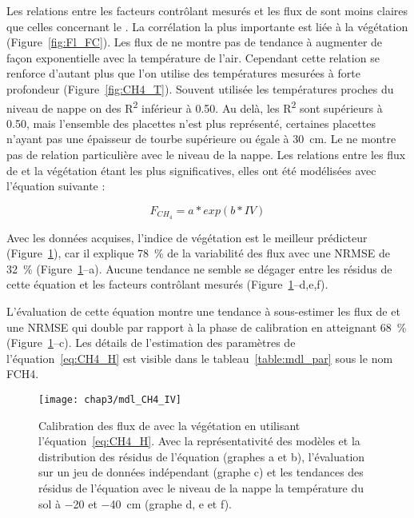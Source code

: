 Les relations entre les facteurs contrôlant mesurés et les flux de \chh sont moins claires que celles concernant le \coo.
La corrélation la plus importante est liée à la végétation (Figure~\ref{fig:Fl_FC}).
Les flux de \chh ne montre pas de tendance à augmenter de façon exponentielle avec la température de l'air.
Cependant cette relation se renforce d'autant plus que l'on utilise des températures mesurées à forte profondeur (Figure~\ref{fig:CH4_T}).
Souvent utilisée les températures proches du niveau de nappe on des R\textsuperscript{2} inférieur à \num{0.50}.
Au delà, les R\textsuperscript{2} sont supérieurs à \num{0.50}, mais l'ensemble des placettes n'est plus représenté, certaines placettes n'ayant pas une épaisseur de tourbe supérieure ou égale à \SI{30}{\centi\metre}.
Le \chh ne montre pas de relation particulière avec le niveau de la nappe.
Les relations entre les flux de \chh et la végétation étant les plus significatives, elles ont été modélisées avec l'équation suivante :

\begin{equation} \label{eq:CH4_H}
F_{CH_{4}} = a*exp(b*IV)
\end{equation}

Avec les données acquises, l'indice de végétation est le meilleur prédicteur (Figure~\ref{fig:CH4_mdl}), car il explique \SI{78}{\percent} de la variabilité des flux \chh avec une NRMSE de \SI{32}{\percent} (Figure~\ref{fig:CH4_mdl}--a).
Aucune tendance ne semble se dégager entre les résidus de cette équation et les facteurs contrôlant mesurés (Figure~\ref{fig:CH4_mdl}--d,e,f).

L'évaluation de cette équation montre une tendance à sous-estimer les flux de \chh et une NRMSE qui double par rapport à la phase de calibration en atteignant \SI{68}{\percent} (Figure~\ref{fig:CH4_mdl}--c).
Les détails de l'estimation des paramètres de l'équation~\ref{eq:CH4_H} est visible dans le tableau~\ref{table:mdl_par} sous le nom FCH4.

\begin{figure}
\centering
\texttt{[image: chap3/mdl\_CH4\_IV]}
\caption{Calibration des flux de \chh avec la végétation en utilisant l'équation~\ref{eq:CH4_H}. Avec la représentativité des modèles et la distribution des résidus de l'équation (graphes a et b), l'évaluation sur un jeu de données indépendant (graphe c) et les tendances des résidus de l'équation avec le niveau de la nappe la température du sol à \num{-20} et \SI{-40}{\centi\metre} (graphe d, e et f).}
\label{fig:CH4_mdl}
\end{figure}




